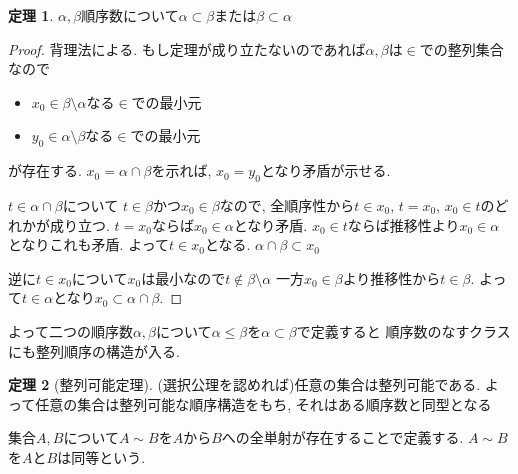 \documentclass[dvipdfmx,a4paper,11pt]{report}
\theoremstyle{definition}
\newtheorem{thm}{定理}
\begin{document}
 \begin{tcolorbox}
 [colback = white, colframe = green!35!black, fonttitle = \bfseries,breakable = true]
\begin{thm}\cite[定理3.3.7]{Tana}
\label{thm-tanaka-3.3.7}
$\alpha, \beta$順序数について$\alpha \subset \beta$または$\beta \subset \alpha$
\end{thm}
\end{tcolorbox}

\begin{proof}
背理法による. 
もし定理が成り立たないのであれば$\alpha, \beta$は$\in$での整列集合なので
\begin{itemize}
\item $x_0 \in \beta \setminus \alpha$なる$\in$での最小元
\item $y_0 \in  \alpha \setminus \beta$なる$\in$での最小元
\end{itemize}
が存在する.
$x_0 = \alpha \cap \beta$を示れば, $x_0=y_0$となり矛盾が示せる.

$t \in \alpha \cap \beta$について
$t \in \beta$かつ$x_0 \in \beta$なので, 全順序性から$t \in x_0$, $t =x_0$, $x_0 \in t$のどれかが成り立つ. 
$t =x_0$ならば$x_0 \in \alpha$となり矛盾. $x_0 \in t$ならば推移性より$x_0 \in \alpha$となりこれも矛盾. よって$t \in x_0$となる. $\alpha \cap \beta \subset x_0$

逆に$t \in x_0$について$x_0$は最小なので$t \not \in \beta \setminus \alpha$
一方$x_0 \in \beta$より推移性から$t \in \beta$. よって$t \in \alpha$となり$x_0 \subset \alpha \cap \beta$.
\end{proof}

よって二つの順序数$\alpha, \beta$について$\alpha \le \beta$を$\alpha \subset \beta$で定義すると
順序数のなすクラスにも整列順序の構造が入る. 

 \begin{tcolorbox}
 [colback = white, colframe = green!35!black, fonttitle = \bfseries,breakable = true]
\begin{thm}[整列可能定理]
(選択公理を認めれば)任意の集合は整列可能である. 
よって任意の集合は整列可能な順序構造をもち, それはある順序数と同型となる
\end{thm}
\end{tcolorbox}

集合$A,B$について$A\sim B$を$A$から$B$への全単射が存在することで定義する. 
$A\sim B$を$A$と$B$は同等という.
\end{document}
